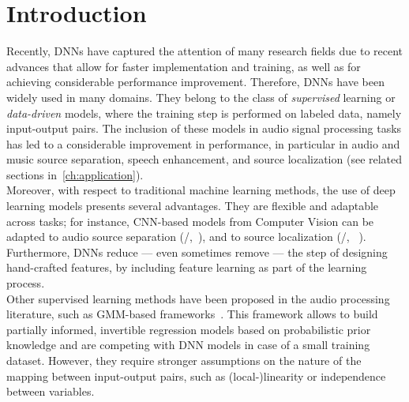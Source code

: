 \section{Introduction}\label{sec:lantern:intro}
Recently, \acfp{DNN} have captured the attention of many research fields due to recent advances that allow for faster implementation and training, as well as for achieving considerable performance improvement.
Therefore, \acp{DNN} have been widely used in many domains.
They belong to the class of \textit{supervised} learning or \textit{data-driven} models, where the training step is performed on labeled data, namely input-output pairs.
The inclusion of these models in audio signal processing tasks has led to a considerable improvement in performance, in particular in audio and music source separation, speech enhancement, and source localization (see related sections in~\cref{ch:application}).
\\Moreover, with respect to traditional machine learning methods, the use of deep learning models presents several advantages.
They are flexible and adaptable across tasks; for instance, \acf{CNN}-based models from Computer Vision can be adapted to audio source separation (\eg/,~), and to source localization (\eg/, ~).
Furthermore, \acp{DNN} reduce --- even sometimes remove --- the step of designing hand-crafted features, by including feature learning as part of the learning process.
\\Other
{} supervised learning methods have been proposed in the audio processing literature, such as \ac{GMM}-based frameworks~.
This framework allows to build partially informed, invertible regression models based on probabilistic prior knowledge and are competing with \ac{DNN} models in case of a small training dataset.
However, they require stronger assumptions on the nature of the mapping between input-output pairs, such as (local-)linearity or independence between variables.

